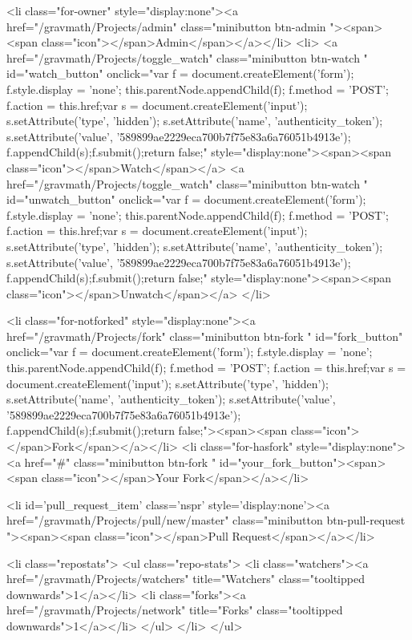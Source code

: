       
        <li class="for-owner" style="display:none"><a href="/gravmath/Projects/admin" class="minibutton btn-admin "><span><span class="icon"></span>Admin</span></a></li>
        <li>
          <a href="/gravmath/Projects/toggle_watch" class="minibutton btn-watch " id="watch_button" onclick="var f = document.createElement('form'); f.style.display = 'none'; this.parentNode.appendChild(f); f.method = 'POST'; f.action = this.href;var s = document.createElement('input'); s.setAttribute('type', 'hidden'); s.setAttribute('name', 'authenticity_token'); s.setAttribute('value', '589899ae2229eca700b7f75e83a6a76051b4913e'); f.appendChild(s);f.submit();return false;" style="display:none"><span><span class="icon"></span>Watch</span></a>
          <a href="/gravmath/Projects/toggle_watch" class="minibutton btn-watch " id="unwatch_button" onclick="var f = document.createElement('form'); f.style.display = 'none'; this.parentNode.appendChild(f); f.method = 'POST'; f.action = this.href;var s = document.createElement('input'); s.setAttribute('type', 'hidden'); s.setAttribute('name', 'authenticity_token'); s.setAttribute('value', '589899ae2229eca700b7f75e83a6a76051b4913e'); f.appendChild(s);f.submit();return false;" style="display:none"><span><span class="icon"></span>Unwatch</span></a>
        </li>
        
          
            <li class="for-notforked" style="display:none"><a href="/gravmath/Projects/fork" class="minibutton btn-fork " id="fork_button" onclick="var f = document.createElement('form'); f.style.display = 'none'; this.parentNode.appendChild(f); f.method = 'POST'; f.action = this.href;var s = document.createElement('input'); s.setAttribute('type', 'hidden'); s.setAttribute('name', 'authenticity_token'); s.setAttribute('value', '589899ae2229eca700b7f75e83a6a76051b4913e'); f.appendChild(s);f.submit();return false;"><span><span class="icon"></span>Fork</span></a></li>
            <li class="for-hasfork" style="display:none"><a href="#" class="minibutton btn-fork " id="your_fork_button"><span><span class="icon"></span>Your Fork</span></a></li>
          

          <li id='pull_request_item' class='nspr' style='display:none'><a href="/gravmath/Projects/pull/new/master" class="minibutton btn-pull-request "><span><span class="icon"></span>Pull Request</span></a></li>
        
      
      
      <li class="repostats">
        <ul class="repo-stats">
          <li class="watchers"><a href="/gravmath/Projects/watchers" title="Watchers" class="tooltipped downwards">1</a></li>
          <li class="forks"><a href="/gravmath/Projects/network" title="Forks" class="tooltipped downwards">1</a></li>
        </ul>
      </li>
    </ul>

